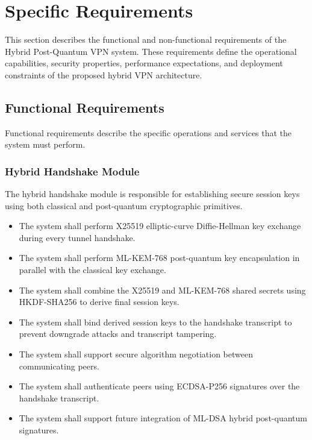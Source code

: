 
\section{Specific Requirements}

This section describes the functional and non-functional requirements of the Hybrid Post-Quantum VPN system. These requirements define the operational capabilities, security properties, performance expectations, and deployment constraints of the proposed hybrid VPN architecture.

\subsection{Functional Requirements}

Functional requirements describe the specific operations and services that the system must perform.

\subsubsection{Hybrid Handshake Module}

The hybrid handshake module is responsible for establishing secure session keys using both classical and post-quantum cryptographic primitives.

\begin{itemize}

    \item The system shall perform X25519 elliptic-curve Diffie-Hellman key exchange during every tunnel handshake.

    \item The system shall perform ML-KEM-768 post-quantum key encapsulation in parallel with the classical key exchange.

    \item The system shall combine the X25519 and ML-KEM-768 shared secrets using HKDF-SHA256 to derive final session keys.

    \item The system shall bind derived session keys to the handshake transcript to prevent downgrade attacks and transcript tampering.

    \item The system shall support secure algorithm negotiation between communicating peers.

    \item The system shall authenticate peers using ECDSA-P256 signatures over the handshake transcript.

    \item The system shall support future integration of ML-DSA hybrid post-quantum signatures.

\end{itemize}

